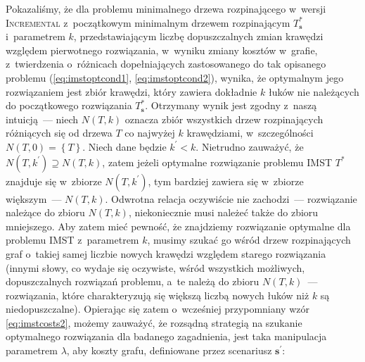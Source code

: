 Pokazaliśmy, że dla problemu minimalnego drzewa rozpinającego w~wersji \textsc{Incremental} z~początkowym minimalnym drzewem rozpinającym $T^{\ast}_{\textbf{s}}$ i~parametrem $k$, przedstawiającym liczbę dopuszczalnych zmian krawędzi względem pierwotnego rozwiązania, w~wyniku zmiany kosztów w~grafie, z~twierdzenia o~różnicach dopełniających zastosowanego do tak opisanego problemu (\ref{eq:imstoptcond1}, \ref{eq:imstoptcond2}), wynika, że optymalnym jego rozwiązaniem jest zbiór krawędzi, który zawiera dokładnie $k$ łuków nie należących do początkowego rozwiązania $T^{\ast}_{\textbf{s}}$.
Otrzymany wynik jest zgodny z~naszą intuicją~--- niech $N \left( T, k \right)$ oznacza zbiór wszystkich drzew rozpinających różniących się od drzewa $T$ co najwyżej $k$ krawędziami, w~szczególności $N \left( T, 0 \right) = \left\{ T \right\}$.
Niech dane będzie $k^{\prime} < k$.
Nietrudno zauważyć, że $N \left( T, k^{\prime} \right) \supseteq N \left( T, k \right)$, zatem jeżeli optymalne rozwiązanie problemu \textsc{IMST} $T^{\ast}$ znajduje się w~zbiorze $N \left( T, k^{\prime} \right)$, tym bardziej zawiera się w~zbiorze większym~--- $N \left( T, k \right)$.
Odwrotna relacja oczywiście nie zachodzi~--- rozwiązanie należące do zbioru $N \left( T, k \right)$, niekoniecznie musi należeć także do zbioru mniejszego.
Aby zatem mieć pewność, że znajdziemy rozwiązanie optymalne dla problemu \textsc{IMST} z~parametrem $k$, musimy szukać go wśród drzew rozpinających graf o~takiej samej liczbie nowych krawędzi względem starego rozwiązania (innymi słowy, co wydaje się oczywiste, wśród wszystkich możliwych, dopuszczalnych rozwiązań problemu, a~te należą do zbioru $N \left( T, k \right)$~--- rozwiązania, które charakteryzują się większą liczbą nowych łuków niż $k$ są niedopuszczalne).
Opierając się zatem o~wcześniej przypomniany wzór \ref{eq:imstcosts2}, możemy zauważyć, że rozsądną strategią na szukanie optymalnego rozwiązania dla badanego zagadnienia, jest taka manipulacja parametrem $\lambda$, aby koszty grafu, definiowane przez scenariusz $\textbf{s}^{\prime}$:

